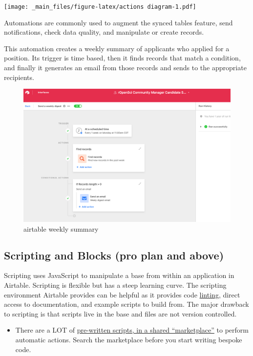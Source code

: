 \documentclass[
]{book}
\providecommand{\tightlist}{%
  \setlength{\itemsep}{0pt}\setlength{\parskip}{0pt}}
\begin{document}
\texttt{[image: \_main\_files/figure-latex/actions diagram-1.pdf]}

Automations are commonly used to augment the synced tables feature, send notifications, check data quality, and manipulate or create records.

This automation creates a weekly summary of applicants who applied for a position. Its trigger is time based, then it finds records that match a condition, and finally it generates an email from those records and sends to the appropriate recipients.

\begin{figure}
\centering
\includegraphics{./images/airtable_Weekly Digest.png}
\caption{airtable weekly summary}
\end{figure}

\hypertarget{scripting-and-blocks-pro-plan-and-above}{%
\subsection{Scripting and Blocks (pro plan and above)}\label{scripting-and-blocks-pro-plan-and-above}}

Scripting uses JavaScript to manipulate a base from within an application in Airtable. Scripting is flexible but has a steep learning curve. The scripting environment Airtable provides can be helpful as it provides code \href{https://en.wikipedia.org/wiki/Lint_(software)}{linting}, direct access to documentation, and example scripts to build from. The major drawback to scripting is that scripts live in the base and files are not version controlled.

\begin{itemize}
\tightlist
\item
  There are a LOT of \href{https://airtable.com/marketplace/category/scripts}{pre-written scripts, in a shared ``marketplace''} to perform automatic actions. Search the marketplace before you start writing bespoke code.
\end{itemize}
\end{document}
